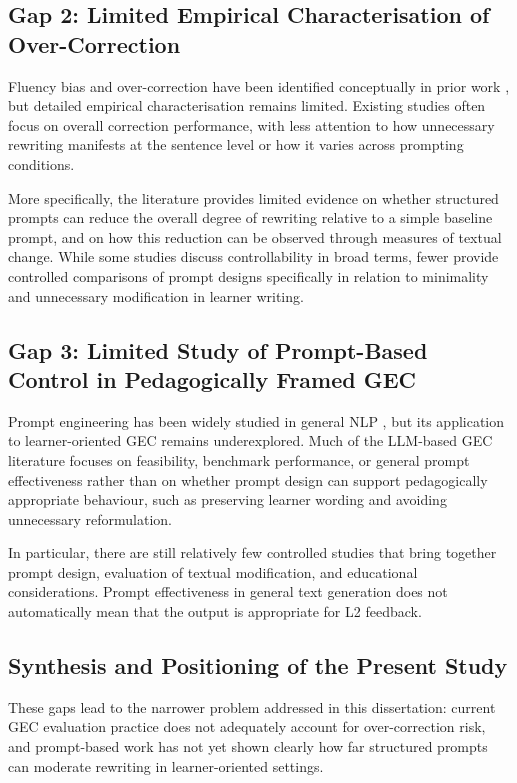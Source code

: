 \subsection{Gap 2: Limited Empirical Characterisation of Over-Correction}

Fluency bias and over-correction have been identified conceptually in prior work \cite{loem2023exploringeffectivenessgpt3grammatical}, but detailed empirical characterisation remains limited. Existing studies often focus on overall correction performance, with less attention to how unnecessary rewriting manifests at the sentence level or how it varies across prompting conditions.

More specifically, the literature provides limited evidence on whether structured prompts can reduce the overall degree of rewriting relative to a simple baseline prompt, and on how this reduction can be observed through measures of textual change. While some studies discuss controllability in broad terms, fewer provide controlled comparisons of prompt designs specifically in relation to minimality and unnecessary modification in learner writing.

\subsection{Gap 3: Limited Study of Prompt-Based Control in Pedagogically Framed GEC}

Prompt engineering has been widely studied in general NLP \cite{liu2023pretrain,wei2022finetuned}, but its application to learner-oriented GEC remains underexplored. Much of the LLM-based GEC literature focuses on feasibility, benchmark performance, or general prompt effectiveness rather than on whether prompt design can support pedagogically appropriate behaviour, such as preserving learner wording and avoiding unnecessary reformulation.

In particular, there are still relatively few controlled studies that bring together prompt design, evaluation of textual modification, and educational considerations. Prompt effectiveness in general text generation does not automatically mean that the output is appropriate for L2 feedback.

\subsection*{Synthesis and Positioning of the Present Study}

These gaps lead to the narrower problem addressed in this dissertation: current GEC evaluation practice does not adequately account for over-correction risk, and prompt-based work has not yet shown clearly how far structured prompts can moderate rewriting in learner-oriented settings.

